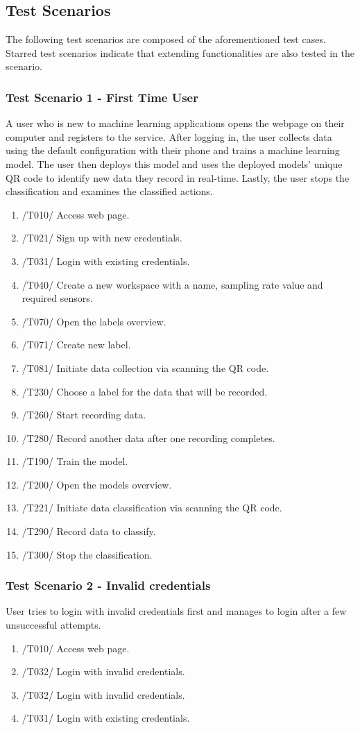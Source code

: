 \subsection{Test Scenarios}
The following test scenarios are composed of the aforementioned test cases. Starred test scenarios indicate that extending functionalities are also tested in the scenario.
\subsubsection{Test Scenario 1 - First Time User}
A user who is new to machine learning applications opens the webpage on their computer and registers to the service. After logging in, the user collects data using the default configuration with their phone and trains a machine learning model. The user then deploys this model and uses the deployed models' unique QR code to identify new data they record in real-time. Lastly, the user stops the classification and examines the classified actions.
\begin{enumerate}
    \item /T010/ Access web page.
    \item /T021/ Sign up with new credentials.
    \item /T031/ Login with existing credentials.
    \item /T040/ Create a new workspace with a name, sampling rate value and required sensors.
    \item /T070/ Open the labels overview.
    \item /T071/ Create new label.
    \item /T081/ Initiate data collection via scanning the QR code.
    \item /T230/ Choose a label for the data that will be recorded.
    \item /T260/ Start recording data.
    \item /T280/ Record another data after one recording completes.
    \item /T190/ Train the model.
    \item /T200/ Open the models overview.
    \item /T221/ Initiate data classification via scanning the QR code.
    \item /T290/ Record data to classify.
    \item /T300/ Stop the classification.
\end{enumerate}
\subsubsection{Test Scenario 2 - Invalid credentials}
User tries to login with invalid credentials first and manages to login after a few unsuccessful attempts.
\begin{enumerate}
    \item /T010/ Access web page.
    \item /T032/ Login with invalid credentials.
    \item /T032/ Login with invalid credentials.
    \item /T031/ Login with existing credentials.
\end{enumerate}
